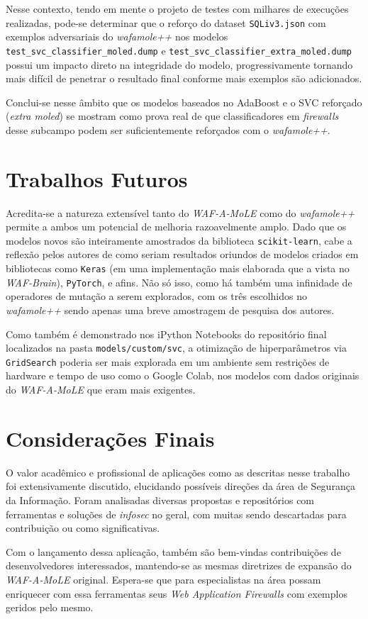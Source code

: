 Nesse contexto, tendo em mente o projeto de testes com milhares de execuções realizadas, pode-se determinar que o reforço do dataset \verb+SQLiv3.json+ com exemplos adversariais do \textit{wafamole++} nos modelos \verb+test_svc_classifier_moled.dump+ e \linebreak \verb+test_svc_classifier_extra_moled.dump+ possui um impacto direto na integridade do modelo, progressivamente tornando mais difícil de penetrar o resultado final conforme mais exemplos são adicionados.

Conclui-se nesse âmbito que os modelos baseados no AdaBoost e o SVC reforçado (\textit{extra moled}) se mostram como prova real de que classificadores em \textit{firewalls} desse subcampo podem ser suficientemente reforçados com o \textit{wafamole++}.


\section{Trabalhos Futuros}
Acredita-se a natureza extensível tanto do \textit{WAF-A-MoLE} como do \textit{wafamole++} permite a ambos um potencial de melhoria razoavelmente amplo. Dado que os modelos novos são inteiramente amostrados da biblioteca \verb+scikit-learn+, cabe a reflexão pelos autores de como seriam resultados oriundos de modelos criados em bibliotecas como \verb+Keras+ (em uma implementação mais elaborada que a vista no \textit{WAF-Brain}), \verb+PyTorch+, e afins. Não só isso, como há também uma infinidade de operadores de mutação a serem explorados, com os três escolhidos no \textit{wafamole++} sendo apenas uma breve amostragem de pesquisa dos autores.

Como também é demonstrado nos iPython Notebooks do repositório final localizados na pasta \verb+models/custom/svc+, a otimização de hiperparâmetros via \verb+GridSearch+ poderia ser mais explorada em um ambiente sem restrições de hardware e tempo de uso como o Google Colab, nos modelos com dados originais do \textit{WAF-A-MoLE} que eram mais exigentes. 

\section{Considerações Finais}
O valor acadêmico e profissional de aplicações como as descritas nesse trabalho foi extensivamente discutido, elucidando possíveis direções da área de Segurança da Informação. Foram analisadas diversas propostas e repositórios com ferramentas e soluções de \textit{infosec} no geral, com muitas sendo descartadas para contribuição ou como significativas. 

Com o lançamento dessa aplicação, também são bem-vindas contribuições de desenvolvedores interessados, mantendo-se as mesmas diretrizes de expansão do \textit{WAF-A-MoLE} original. Espera-se que para especialistas na área possam enriquecer com essa ferramentas seus \textit{Web Application Firewalls}  com exemplos geridos pelo mesmo.
